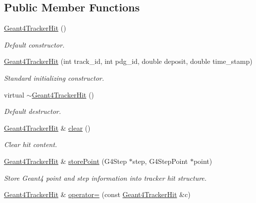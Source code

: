 \subsection*{Public Member Functions}
\begin{DoxyCompactItemize}
\item 
\hyperlink{class_d_d4hep_1_1_simulation_1_1_geant4_tracker_hit_a7642c87408d8d1fc386b297c351747ad}{Geant4\+Tracker\+Hit} ()
\begin{DoxyCompactList}\small\item\em Default constructor. \end{DoxyCompactList}\item 
\hyperlink{class_d_d4hep_1_1_simulation_1_1_geant4_tracker_hit_a0c4153d51119c6b58e6318ff7d9a9a1b}{Geant4\+Tracker\+Hit} (int track\+\_\+id, int pdg\+\_\+id, double deposit, double time\+\_\+stamp)
\begin{DoxyCompactList}\small\item\em Standard initializing constructor. \end{DoxyCompactList}\item 
virtual \hyperlink{class_d_d4hep_1_1_simulation_1_1_geant4_tracker_hit_a4f4febb374cab1cb2e8a0463b84c165e}{$\sim$\+Geant4\+Tracker\+Hit} ()
\begin{DoxyCompactList}\small\item\em Default destructor. \end{DoxyCompactList}\item 
\hyperlink{class_d_d4hep_1_1_simulation_1_1_geant4_tracker_hit}{Geant4\+Tracker\+Hit} \& \hyperlink{class_d_d4hep_1_1_simulation_1_1_geant4_tracker_hit_ae4ad76e698755a72feaf4c7f38d5281f}{clear} ()
\begin{DoxyCompactList}\small\item\em Clear hit content. \end{DoxyCompactList}\item 
\hyperlink{class_d_d4hep_1_1_simulation_1_1_geant4_tracker_hit}{Geant4\+Tracker\+Hit} \& \hyperlink{class_d_d4hep_1_1_simulation_1_1_geant4_tracker_hit_a1c59f0271ec61e504bf572ed4e9b2bb0}{store\+Point} (G4\+Step $\ast$step, G4\+Step\+Point $\ast$point)
\begin{DoxyCompactList}\small\item\em Store Geant4 point and step information into tracker hit structure. \end{DoxyCompactList}\item 
\hyperlink{class_d_d4hep_1_1_simulation_1_1_geant4_tracker_hit}{Geant4\+Tracker\+Hit} \& \hyperlink{class_d_d4hep_1_1_simulation_1_1_geant4_tracker_hit_aab16478430961e4ac76d82d15f07af58}{operator=} (const \hyperlink{class_d_d4hep_1_1_simulation_1_1_geant4_tracker_hit}{Geant4\+Tracker\+Hit} \&c)

\end{DoxyCompactItemize}
